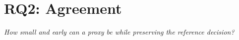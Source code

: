 

\section{RQ2: Agreement}
\label{sec:rq2}

\begin{rquestion}
\textit{How small and early can a proxy be while preserving the reference decision?}    
\end{rquestion}


